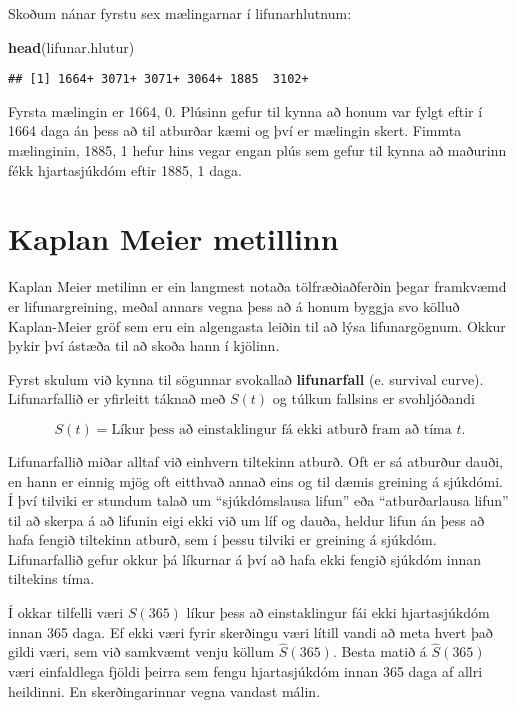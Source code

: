 \documentclass[
]{book}
\newenvironment{Shaded}{\begin{snugshade}}{\end{snugshade}}
\newcommand{\KeywordTok}[1]{\textcolor[rgb]{0.13,0.29,0.53}{\textbf{#1}}}
\newcommand{\NormalTok}[1]{#1}
\begin{document}
Skoðum nánar fyrstu sex mælingarnar í lifunarhlutnum:

\begin{Shaded}
\begin{Highlighting}[]
\KeywordTok{head}\NormalTok{(lifunar.hlutur)}
\end{Highlighting}
\end{Shaded}

\begin{verbatim}
## [1] 1664+ 3071+ 3071+ 3064+ 1885  3102+
\end{verbatim}

Fyrsta mælingin er 1664, 0. Plúsinn gefur til kynna að honum var fylgt eftir í 1664 daga án þess að til atburðar kæmi og því er mælingin skert. Fimmta mælinginin, 1885, 1 hefur hins vegar engan plús sem gefur til kynna að maðurinn fékk hjartasjúkdóm eftir 1885, 1 daga.

\hypertarget{kaplan-meier-metillinn}{%
\section{Kaplan Meier metillinn}\label{kaplan-meier-metillinn}}

Kaplan Meier metilinn er ein langmest notaða tölfræðiaðferðin þegar framkvæmd er lifunargreining, meðal annars vegna þess að á honum byggja svo kölluð Kaplan-Meier gröf sem eru ein algengasta leiðin til að lýsa lifunargögnum. Okkur þykir því ástæða til að skoða hann í kjölinn.

Fyrst skulum við kynna til sögunnar svokallað \textbf{lifunarfall} (e. survival curve). Lifunarfallið er yfirleitt táknað með \(S(t)\) og túlkun fallsins er svohljóðandi

\[ 
S(t) = \text{Líkur þess að einstaklingur fá ekki atburð fram að tíma $t$.}
\]

Lifunarfallið miðar alltaf við einhvern tiltekinn atburð. Oft er sá atburður dauði, en hann er einnig mjög oft eitthvað annað eins og til dæmis greining á sjúkdómi. Í því tilviki er stundum talað um ``sjúkdómslausa lifun'' eða ``atburðarlausa lifun'' til að skerpa á að lifunin eigi ekki við um líf og dauða, heldur lifun án þess að hafa fengið tiltekinn atburð, sem í þessu tilviki er greining á sjúkdóm. Lifunarfallið gefur okkur þá líkurnar á því að hafa ekki fengið sjúkdóm innan tiltekins tíma.

Í okkar tilfelli væri \(S(365)\) líkur þess að einstaklingur fái ekki hjartasjúkdóm innan 365 daga. Ef ekki væri fyrir skerðingu væri lítill vandi að meta hvert það gildi væri, sem við samkvæmt venju köllum \(\hat S(365)\). Besta matið á \(\hat S(365)\) væri einfaldlega fjöldi þeirra sem fengu hjartasjúkdóm innan 365 daga af allri heildinni. En skerðingarinnar vegna vandast málin.
\end{document}
